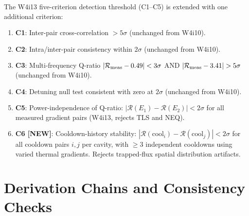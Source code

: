 \documentclass[11pt]{article}
\theoremstyle{definition}
\theoremstyle{remark}
\begin{document}
The W4i13 five-criterion detection threshold (C1--C5) is extended with
one additional criterion:

\begin{tcolorbox}[colback=green!5!white, colframe=green!60!black,
  title=\textbf{UPDATED DETECTION CRITERIA (5$\sigma$ discovery)}]
\begin{enumerate}[label=\textbf{C\arabic*.}, itemsep=6pt]

\item \textbf{C1}: Inter-pair cross-correlation $> 5\sigma$
  (unchanged from W4i10).

\item \textbf{C2}: Intra/inter-pair consistency within $2\sigma$
  (unchanged from W4i10).

\item \textbf{C3}: Multi-frequency Q-ratio $|\mathcal{R}_{\rm meas}
  - 0.49| < 3\sigma$ AND $|\mathcal{R}_{\rm meas} - 3.41| > 5\sigma$
  (unchanged from W4i10).

\item \textbf{C4}: Detuning null test consistent with zero at $2\sigma$
  (unchanged from W4i10).

\item \textbf{C5}: Power-independence of Q-ratio:
  $|\mathcal{R}(E_1) - \mathcal{R}(E_2)| < 2\sigma$ for all
  measured gradient pairs (W4i13, rejects TLS and NEQ).

\item \textbf{C6 [NEW]}: Cooldown-history stability:
  $|\mathcal{R}(\text{cool}_i) - \mathcal{R}(\text{cool}_j)|
  < 2\sigma$ for all cooldown pairs $i, j$ per cavity, with
  $\geq$3 independent cooldowns using varied thermal gradients.
  Rejects trapped-flux spatial distribution artifacts.

\end{enumerate}
\end{tcolorbox}


\part{Derivation Chains and Consistency Checks}
\label{part:derivations}


\end{document}
